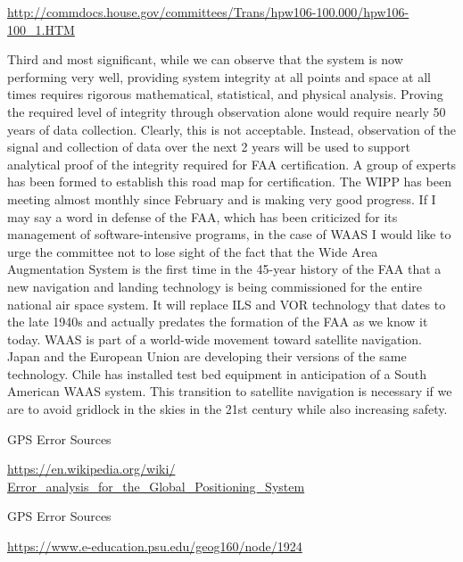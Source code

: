
\noindent
\url{http://commdocs.house.gov/committees/Trans/hpw106-100.000/hpw106-100_1.HTM}
\citep[]{HOUSE-JUNE-2000}

Third and most significant, while we can observe that the system is now performing very well, providing system integrity at all points and space at all times requires rigorous mathematical, statistical, and physical analysis. Proving the required level of integrity through observation alone would require nearly 50 years of data collection. Clearly, this is not acceptable. Instead, observation of the signal and collection of data over the next 2 years will be used to support analytical proof of the integrity required for FAA certification.
A group of experts has been formed to establish this road map for certification. The WIPP has been meeting almost monthly since February and is making very good progress.
If I may say a word in defense of the FAA, which has been criticized for its management of software-intensive programs, in the case of WAAS I would like to urge the committee not to lose sight of the fact that the Wide Area Augmentation System is the first time in the 45-year history of the FAA that a new navigation and landing technology is being commissioned for the entire national air space system. It will replace ILS and VOR technology that dates to the late 1940s and actually predates the formation of the FAA as we know it today.
WAAS is part of a world-wide movement toward satellite navigation. Japan and the European Union are developing their versions of the same technology. Chile has installed test bed equipment in anticipation of a South American WAAS system. This transition to satellite navigation is necessary if we are to avoid gridlock in the skies in the 21st century while also increasing safety.

\noindent
GPS Error Sources

\noindent
\url{https://en.wikipedia.org/wiki/
Error_analysis_for_the_Global_Positioning_System}

\noindent
GPS Error Sources

\noindent
\url{https://www.e-education.psu.edu/geog160/node/1924}
